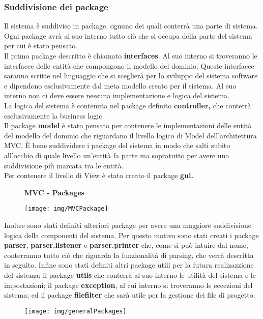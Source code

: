 \documentclass{article}
\begin{document}
  \subsubsection{Suddivisione dei package}
  Il sistema è suddiviso in package, ognuno dei quali conterrà una parte di sistema.\\
  Ogni package avrà al suo interno tutto ciò che si occupa della parte del sistema per cui è stato pensato.\\
  Il primo package descritto è chiamato \textbf{interfaces}. Al suo interno si troveranno le interfacce delle entità che compongono il modello del dominio. Queste
  interfacce saranno scritte nel linguaggio che si sceglierà per lo sviluppo del sistema software e dipendono esclusivamente dal meta modello creato per il sistema.
  Al suo interno non ci deve essere nessuna implementazione e logica del sistema.\\
  La logica del sistema è contenuta nel package definito \textbf{controller,} che conterrà esclusivamente la business logic.\\
  Il package \textbf{model} è stato pensato per contenere le implementazioni delle entità del modello del dominio che riguardano il livello logico di Model
  dell'architettura MVC. È bene suddividere i package del sistema in modo che salti subito all'occhio di quale livello un'entità fa parte ma sopratutto per avere una suddivisione
  più marcata tra le entità.\\
  Per contenere il livello di View è stato creato il package \textbf{gui.}
  \begin{figure}[H]
    \centering
    \begin{framed}
      \textbf{MVC - Packages}\par\medskip
      \texttt{[image: img/MVCPackage]}
    \end{framed}
  \end{figure}
  Inoltre sono stati definiti ulteriori package per avere una maggiore suddivisione logica della componenti del sistema. Per questo motivo sono stati creati i package
  \textbf{parser}, \textbf{parser.listener} e \textbf{parser.printer} che, come si può intuire dal nome, conterranno tutto ciò che riguarda la funzionalità di parsing, che verrà descritta in seguito.
  Infine sono stati definiti altri package utili per la futura realizazzione del sistema: il package \textbf{utils} che conterrà al suo interno le utilità del sistema
  e le impostazioni; il package \textbf{exception}, al cui interno si troveranno le eccezioni del sistema; ed il package \textbf{filefilter} che sarà utile per la gestione dei file
  di progetto.
  \begin{figure}[H]
    \centering
    \begin{framed}
      \texttt{[image: img/generalPackages]}
    \end{framed}
  \end{figure}
\end{document}
